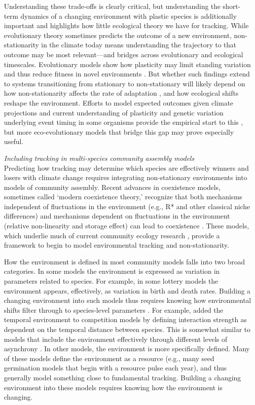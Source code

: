 \documentclass[11pt,letterpaper]{article}
\newcommand{\R}[1]{\label{#1}\linelabel{#1}}
\begin{document}
Understanding these trade-offs is clearly critical, but understanding the short-term dynamics of a changing environment with plastic species is additionally important and highlights how little ecological theory we have for tracking. While evolutionary theory sometimes predicts the outcome of a new environment, non-stationarity in the climate today means understanding the trajectory to that outcome may be most relevant---and bridges across evolutionary and ecological timescales. Evolutionary models show how plasticity may limit standing variation and thus reduce fitness in novel environments \citep{Ghalambor2007,fox2019}. But whether such findings extend to systems transitioning from stationary to non-stationary will likely depend on how non-stationarity affects the rate of adaptation \citep{chevin2010}, and how ecological shifts reshape the environment. Efforts to model expected outcomes given climate projections and current understanding of plasticity and genetic variation underlying event timing in some organisms provide the empirical start to this \citep[e.g.,][]{fournier2016}, but more eco-evolutionary models that bridge this gap may prove especially useful. 

\emph{Including tracking in multi-species community assembly models} \\
Predicting how tracking may determine which species are effectively winners and losers with climate change requires integrating non-stationary environments into models of community assembly. Recent advances in coexistence models, sometimes called `modern coexistence theory,' recognize that both mechanisms independent of fluctuations in the environment (e.g., R* and other classical niche differences) and mechanisms dependent on fluctuations in the environment (relative non-linearity and storage effect) can lead to coexistence \citep{Chesson:1997dz,Chesson:2000vd}. These models, which underlie much of current community ecology research \citep{Mayfield:2010fe,barabas2018,ellner2019}, provide a framework to begin to model environmental tracking and non-stationarity. 

How the environment is defined in most community models falls into two broad categories. In some models the environment is expressed as variation in parameters related to species. For example, in some lottery models the environment appears, effectively, as variation in birth and death rates. Building a changing environment into such models thus requires knowing how environmental shifts filter through to species-level parameters \citep{Tuljapurkar2009}. For example, \citet{volkerass} added the temporal environment to competition models by defining interaction strength as dependent on the temporal distance between species. This is somewhat similar to models that include \R{doublethe}the environment effectively through different levels of asynchrony \citep[e.g.,][]{Nakazawa2012,revilla2014}. In other models, the environment is more specifically defined. Many of these models define the environment as a resource (e.g., many seed germination models that begin with a resource pulse each year), and thus generally model something close to fundamental tracking. Building a changing environment into these models requires knowing how the environment is changing.
\end{document}
